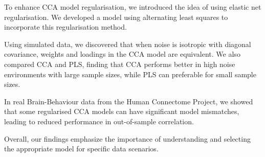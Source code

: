 To enhance CCA model regularisation, we introduced the idea of using elastic net regularisation.
We developed a model using alternating least squares to incorporate this regularisation method.

Using simulated data, we discovered that when noise is isotropic with diagonal covariance, weights and loadings in the CCA model are equivalent.
We also compared CCA and PLS, finding that CCA performs better in high noise environments with large sample sizes,
while PLS can preferable for small sample sizes.

In real Brain-Behaviour data from the Human Connectome Project, we showed that some regularised CCA models can have significant model mismatches, leading to reduced performance in out-of-sample correlation.

Overall, our findings emphasize the importance of understanding and selecting the appropriate model for specific data scenarios.



